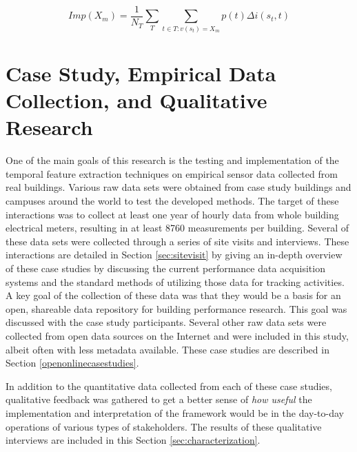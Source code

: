 \begin{equation}
Imp(X_m) = \frac{1}{N_T}\sum\limits_T\sum\limits_{t\in T:v(s_t)=X_m} p(t) \Delta i (s_t, t)
\label{eq:varimportance}
\end{equation}

\section{Case Study, Empirical Data Collection, and Qualitative Research}
\label{sec:screeningdata}


One of the main goals of this research is the testing and implementation of the temporal feature extraction techniques on empirical sensor data collected from real buildings. Various raw data sets were obtained from case study buildings and campuses around the world to test the developed methods. The target of these interactions was to collect at least one year of hourly data from whole building electrical meters, resulting in at least 8760 measurements per building. Several of these data sets were collected through a series of site visits and interviews. These interactions are detailed in Section \ref{sec:sitevisit} by giving an in-depth overview of these case studies by discussing the current performance data acquisition systems and the standard methods of utilizing those data for tracking activities. A key goal of the collection of these data was that they would be a basis for an open, shareable data repository for building performance research. This goal was discussed with the case study participants. Several other raw data sets were collected from open data sources on the Internet and were included in this study, albeit often with less metadata available. These case studies are described in Section \ref{openonlinecasestudies}. 

In addition to the quantitative data collected from each of these case studies, qualitative feedback was gathered to get a better sense of \emph{how useful} the implementation and interpretation of the framework would be in the day-to-day operations of various types of stakeholders. The results of these qualitative interviews are included in this Section \ref{sec:characterization}.

